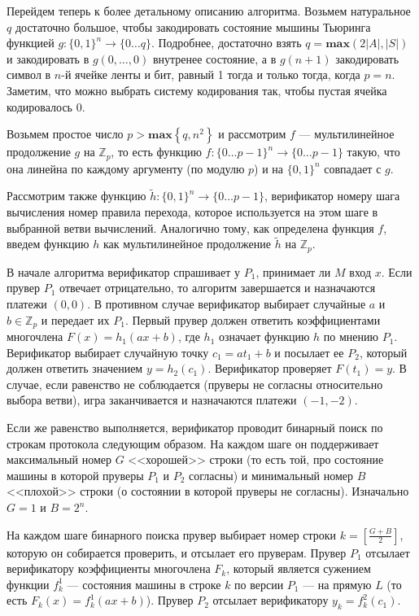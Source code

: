 \documentclass[14pt, a4paper]{extreport}
\newcommand{\set}[1]{\left\{#1\right\}}
\begin{document}
        Перейдем теперь к более детальному описанию алгоритма. Возьмем натуральное $q$ достаточно большое, чтобы закодировать состояние мышины Тьюринга функцией $g: \{0, 1\}^n \longrightarrow \{0\ldots q\}$. Подробнее, достаточно взять $q = \textbf{max}(2|A|, |S|)$ и закодировать в $g(0,\ldots,0)$ внутренее состояние, а в $g(n + 1)$ закодировать символ в $n$-й ячейке ленты и бит, равный 1 тогда и только тогда, когда $p = n$. Заметим, что можно выбрать систему кодирования так, чтобы пустая ячейка кодировалось 0.

        Возьмем простое число $p > \textbf{max}\set{q, n^2}$ и рассмотрим $f$ --- мультилинейное продолжение $g$ на $\mathbb{Z}_p$, то есть функцию $f: \{0\ldots p-1\}^n \longrightarrow \{0 \ldots p-1\}$ такую, что она линейна по каждому аргументу (по модулю $p$) и на $\{0, 1\}^n$ совпадает с $g$.

        Рассмотрим также функцию $\widetilde{h}: \{0, 1\}^n \longrightarrow \{0\ldots p-1\}$, верификатор номеру шага вычисления номер правила перехода, которое используется на этом шаге в выбранной ветви вычислений. Аналогично тому, как определена функция $f$, введем функцию $h$ как мультилинейное продолжение $\widetilde{h}$ на $\mathbb{Z}_p$.

        В начале алгоритма верификатор спрашивает у $P_1$, принимает ли $M$ вход $x$. Если прувер $P_1$ отвечает отрицательно, то алгоритм завершается и назначаются платежи $(0, 0)$.
        В противном случае верификатор выбирает случайные $a$ и $b \in \mathbb{Z}_p$ и передает их $P_1$. Первый прувер должен ответить коэффициентами многочлена $F(x) = h_1(ax + b)$, где $h_1$ означает функцию $h$ по мнению $P_1$. Верификатор выбирает случайную точку $c_1 = a t_1 + b$ и посылает ее $P_2$, который должен ответить значением $y = h_2(c_1)$. Верификатор проверяет $F(t_1) = y$. В случае, если равенство не соблюдается (пруверы не согласны относительно выбора ветви), игра заканчивается и назначаются платежи $(-1, -2)$.

        Если же равенство выполняется, верификатор проводит бинарный поиск по строкам протокола следующим образом. На каждом шаге он поддерживает максимальный номер $G$ <<хорошей>> строки (то есть той, про состояние машины в которой пруверы $P_1$ и $P_2$ согласны) и минимальный номер $B$ <<плохой>> строки (о состоянии в которой пруверы не согласны). Изначально $G=1$ и $B=2^n$.

        На каждом шаге бинарного поиска прувер выбирает номер строки $k = \left[\frac{G + B}{2}\right]$, которую он собирается проверить, и отсылает его пруверам. Прувер $P_1$ отсылает верификатору коэффициенты многочлена $F_k$, который является сужением функции $f^1_k$ --- состояния машины в строке $k$ по версии $P_1$ --- на прямую $L$ (то есть $F_k(x) = f^1_k(ax + b)$). Прувер $P_2$ отсылает верификатору $y_k = f^2_k(c_1)$.
\end{document}

